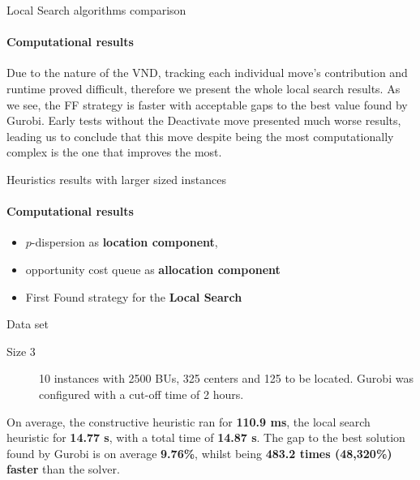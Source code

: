 \documentclass{beamer}
\begin{document}
\begin{frame}{Local Search algorithms comparison}
    \framesubtitle{Computational results}
    \begin{table}
        \centering
        \caption{Local Search Heuristics Comparison of Averages.}
        \label{tab:ls_improv_exp}
    \end{table}
   Due to the nature of the VND, tracking each individual move's contribution and runtime proved difficult, therefore we present the whole local search results. As we see, the FF strategy is faster with acceptable gaps to the best value found by Gurobi. Early tests without the Deactivate move presented much worse results, leading us to conclude that this move despite being the most computationally complex is the one that improves the most.
\end{frame}

\begin{frame}{Heuristics results with larger sized instances}
    \framesubtitle{Computational results}
    \begin{itemize}
        \item $p$-dispersion as \textbf{location component}, 
        \item opportunity cost queue as \textbf{allocation component}
        \item First Found strategy for the \textbf{Local Search}
    \end{itemize}
    \begin{block}{Data set}
        \begin{description}
            \item[Size 3] 10 instances with 2500 BUs, 325 centers and 125 to be located. Gurobi was configured with a cut-off time of 2 hours.
        \end{description}
    \end{block}
    On average, the constructive heuristic ran for \textbf{110.9 ms}, the local search heuristic for \textbf{14.77 s}, with a total time of \textbf{14.87 s}. The gap to the best solution found by Gurobi is on average \textbf{9.76\%}, whilst being \textbf{483.2 times (48,320\%) faster} than the solver.
\end{frame}
\end{document}
